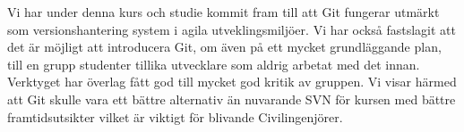 Vi har under denna kurs och studie kommit fram till att Git fungerar utmärkt som versionshantering system i agila utveklingsmiljöer. Vi har också fastslagit att det är möjligt att introducera Git, om även på ett mycket grundläggande plan, till en grupp studenter tillika utvecklare som aldrig arbetat med det innan. Verktyget har överlag fått god till mycket god kritik av gruppen. Vi visar härmed att Git skulle vara ett bättre alternativ än nuvarande SVN för kursen med bättre framtidsutsikter vilket är viktigt för blivande Civilingenjörer. 